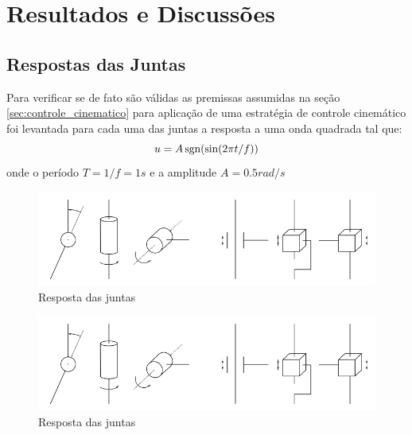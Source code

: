 \chapter{Resultados e Discussões}

\section{Respostas das Juntas}
Para verificar se de fato são válidas as premissas assumidas na seção \ref{sec:controle_cinematico} para aplicação de uma estratégia de controle cinemático foi levantada para cada uma das juntas a resposta a uma onda quadrada tal que:
\[ u = A \operatorname{sgn}(\sin( 2\pi t/f)) \]
onde o período $T = 1/f = 1s$ e a amplitude $A = 0.5 rad/s$

\newlength{\imageheight}
\begin{figure}[!ht]
  \centering
    \includegraphics[width=\textwidth, clip=true, trim = 0 0.5\imageheight 0 0 0 mm]{./img/joints}
  \caption{Resposta das juntas}
\end{figure}

\begin{figure}[!ht]
  \centering
    \includegraphics[width=\textwidth, clip=true, trim = 0 0 0 0.5\imageheight 0 mm]{./img/joints}
  \caption{Resposta das juntas}
\end{figure}


